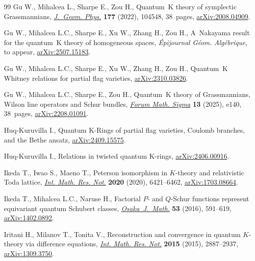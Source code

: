 \documentclass[pdftex]{sigma}
\numberwithin{equation}{section}
\theoremstyle{definition}
\begin{document}
\begin{thebibliography}{99}
Gu W., Mihalcea L., Sharpe E., Zou H., Quantum~{K} theory of symplectic
 {G}rassmannians,
 \href{https://doi.org/10.1016/j.geomphys.2022.104548}{\textit{J.~Geom.
 Phys.}} \textbf{177} (2022), 104548, 38~pages,
 \href{http://arxiv.org/abs/2008.04909}{arXiv:2008.04909}.

Gu W., Mihalcea L.C., Sharpe E., Xu W., Zhang H., Zou H., A~{N}akayama result
 for the quantum~{K} theory of homogeneous spaces, \textit{\'Epijournal
 G\'eom. Alg\'ebrique}, {t}o appear,
 \href{http://arxiv.org/abs/2507.15183}{arXiv:2507.15183}.

Gu W., Mihalcea L.C., Sharpe E., Xu W., Zhang H., Zou H., Quantum~{K} {W}hitney
 relations for partial flag varieties,
 \href{http://arxiv.org/abs/2310.03826}{arXiv:2310.03826}.

Gu W., Mihalcea L.C., Sharpe E., Zou H., Quantum~{K} theory of {G}rassmannians,
 {W}ilson line operators and {S}chur bundles,
 \href{https://doi.org/10.1017/fms.2025.10088}{\textit{Forum Math. Sigma}}
 \textbf{13} (2025), e140, 38~pages,
 \href{http://arxiv.org/abs/2208.01091}{arXiv:2208.01091}.

Huq-Kuruvilla I., Quantum {K}-Rings of partial flag varieties, {C}oulomb
 branches, and the {B}ethe ansatz,
 \href{http://arxiv.org/abs/2409.15575}{arXiv:2409.15575}.

Huq-Kuruvilla I., Relations in twisted quantum {K}-rings,
 \href{http://arxiv.org/abs/2406.00916}{arXiv:2406.00916}.

Ikeda T., Iwao S., Maeno T., Peterson isomorphism in {$K$}-theory and
 relativistic {T}oda lattice,
 \href{https://doi.org/10.1093/imrn/rny051}{\textit{Int. Math. Res. Not.}}
 \textbf{2020} (2020), 6421--6462,
 \href{http://arxiv.org/abs/1703.08664}{arXiv:1703.08664}.

Ikeda T., Mihalcea L.C., Naruse H., Factorial {$P$}- and {$Q$}-{S}chur
 functions represent equivariant quantum {S}chubert classes,
 \href{https://doi.org/10.18910/58871}{\textit{Osaka~J.~Math.}} \textbf{53}
 (2016), 591--619, \href{http://arxiv.org/abs/1402.0892}{arXiv:1402.0892}.

Iritani H., Milanov T., Tonita V., Reconstruction and convergence in quantum
 {$K$}-theory via difference equations,
 \href{https://doi.org/10.1093/imrn/rnu026}{\textit{Int. Math. Res. Not.}}
 \textbf{2015} (2015), 2887--2937,
 \href{http://arxiv.org/abs/1309.3750}{arXiv:1309.3750}.


\end{thebibliography}
\end{document}
